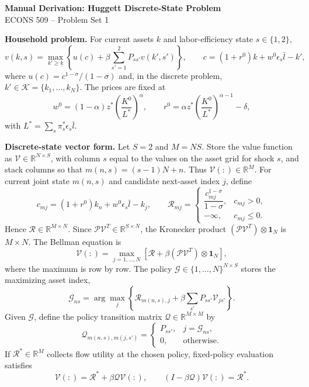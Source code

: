 \documentclass[11pt]{article}
\newcommand{\Rmat}{\mathcal{R}}
\newcommand{\Vmat}{\mathcal{V}}
\newcommand{\Gmat}{\mathcal{G}}
\newcommand{\Qmat}{\mathcal{Q}}
\newcommand{\Pmat}{\mathcal{P}}
\begin{document}
\begin{center}
{\large \textbf{Manual Derivation: Huggett Discrete-State Problem}}\\[2pt]
ECONS 509 -- Problem Set 1
\end{center}

\textbf{Household problem.}
For current assets $k$ and labor-efficiency state $s\in\{1,2\}$,
\[
v(k,s)=\max_{k'\ge \underline{k}}\left\{u(c)+\beta\sum_{s'=1}^{2}P_{ss'}v(k',s')\right\},
\qquad
c=(1+r^0)k+w^0\epsilon_s\bar l-k',
\]
where $u(c)=c^{1-\sigma}/(1-\sigma)$ and, in the discrete problem,
$k'\in\mathcal K=\{k_1,\ldots,k_N\}$.  The prices are fixed at
\[
w^0=(1-\alpha)z^*\left(\frac{K^0}{L^*}\right)^\alpha,
\qquad
r^0=\alpha z^*\left(\frac{K^0}{L^*}\right)^{\alpha-1}-\delta,
\]
with $L^*=\sum_s\pi_s^*\epsilon_s\bar l$.

\textbf{Discrete-state vector form.}
Let $S=2$ and $M=NS$.  Store the value function as
$\Vmat\in\mathbb R^{N\times S}$, with column $s$ equal to the values on the
asset grid for shock $s$, and stack columns so that
$m(n,s)=(s-1)N+n$.  Thus $\Vmat(:)\in\mathbb R^{M}$.
For current joint state $m(n,s)$ and candidate next-asset index $j$, define
\[
c_{m j}=(1+r^0)k_n+w^0\epsilon_s\bar l-k_j,
\qquad
\Rmat_{m j}=\begin{cases}
\dfrac{c_{m j}^{1-\sigma}}{1-\sigma},&c_{m j}>0,\\[5pt]
-\infty,&c_{m j}\le0.
\end{cases}
\]
Hence $\Rmat\in\mathbb R^{M\times N}$.  Since
$\Pmat\Vmat^T\in\mathbb R^{S\times N}$, the Kronecker product
$(\Pmat\Vmat^T)\otimes\mathbf 1_N$ is $M\times N$.  The Bellman equation is
\[
\boxed{\quad
\Vmat(:)=\max_{j=1,\ldots,N}
\left[\Rmat+\beta(\Pmat\Vmat^T)\otimes\mathbf 1_N\right],
\quad}
\]
where the maximum is row by row.  The policy
$\Gmat\in\{1,\ldots,N\}^{N\times S}$ stores the maximizing asset index,
\[
\Gmat_{ns}=\arg\max_j\left\{\Rmat_{m(n,s),j}
+\beta\sum_{s'}P_{ss'}\Vmat_{j s'}\right\}.
\]
Given $\Gmat$, define the policy transition matrix
$\Qmat\in\mathbb R^{M\times M}$ by
\[
\Qmat_{m(n,s),m(j,s')}=
\begin{cases}
P_{ss'},&j=\Gmat_{ns},\\
0,&\text{otherwise}.
\end{cases}
\]
If $\Rmat^*\in\mathbb R^M$ collects flow utility at the chosen policy, fixed-policy
evaluation satisfies
\[
\Vmat(:)=\Rmat^*+\beta\Qmat\Vmat(:),
\qquad
(I-\beta\Qmat)\Vmat(:)=\Rmat^*.
\]
\end{document}
